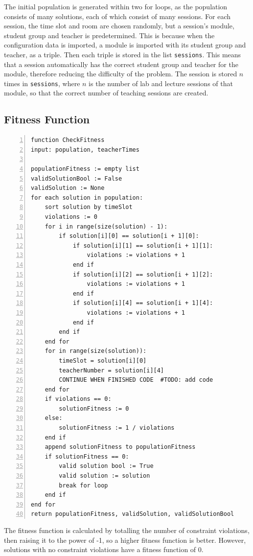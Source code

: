 \documentclass[a4paper, 12pt]{report}
\begin{document}
The initial population is generated within two for loops, as the population
consists of many solutions, each of which consist of many sessions.
For each session, the time slot and room are chosen randomly, but a session's 
module, student group and teacher is predetermined.
This is because when the configuration data is imported, a module is imported 
with its student group and teacher, as a triple.
Then each triple is stored in the list \verb|sessions|.
This means that a session automatically has the correct student group and 
teacher for the module, therefore reducing the difficulty of the problem.
The session is stored \( n \) times in \verb|sessions|, where \( n \) is the 
number of lab and lecture sessions of that module, so that the correct number 
of teaching sessions are created.

\subsection{Fitness Function}

\begin{Verbatim}[numbers=left, fontsize=\footnotesize]
function CheckFitness
input: population, teacherTimes

populationFitness := empty list
validSolutionBool := False
validSolution := None
for each solution in population:
    sort solution by timeSlot
    violations := 0
    for i in range(size(solution) - 1):
        if solution[i][0] == solution[i + 1][0]:
            if solution[i][1] == solution[i + 1][1]:
                violations := violations + 1
            end if
            if solution[i][2] == solution[i + 1][2]:
                violations := violations + 1
            end if
            if solution[i][4] == solution[i + 1][4]:
                violations := violations + 1
            end if
        end if
    end for
    for in range(size(solution)):
        timeSlot = solution[i][0]
        teacherNumber = solution[i][4]
        CONTINUE WHEN FINISHED CODE  #TODO: add code
    end for
    if violations == 0:
        solutionFitness := 0
    else:
	    solutionFitness := 1 / violations 
    end if
    append solutionFitness to populationFitness
    if solutionFitness == 0:
        valid solution bool := True
        valid solution := solution
        break for loop
    end if
end for
return populationFitness, validSolution, validSolutionBool
\end{Verbatim}

The fitness function is calculated by totalling the number of constraint 
violations, then raising it to the power of -1, so a higher fitness function is 
better.
However, solutions with no constraint violations have a fitness function of 0.
\end{document}
